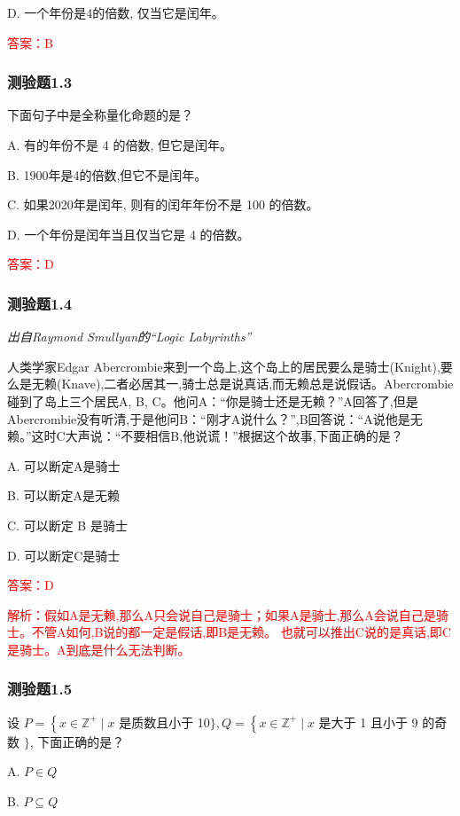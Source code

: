 \documentclass[UTF8, heading=true]{ctexart}
\begin{document}
D. 一个年份是4的倍数, 仅当它是闰年。

\textcolor{red}{答案：B}

\subsubsection{测验题1.3}

下面句子中是全称量化命题的是？

A. 有的年份不是 4 的倍数, 但它是闰年。

B. 1900年是4的倍数,但它不是闰年。

C. 如果2020年是闰年, 则有的闰年年份不是 100 的倍数。

D. 一个年份是闰年当且仅当它是 4 的倍数。

\textcolor{red}{答案：D}

\subsubsection{测验题1.4}

\textit{出自Raymond Smullyan的``Logic Labyrinths''}

人类学家Edgar Abercrombie来到一个岛上,这个岛上的居民要么是骑士(Knight),要么是无赖(Knave),二者必居其一,骑士总是说真话,而无赖总是说假话。Abercrombie碰到了岛上三个居民A, B, C。他问A：“你是骑士还是无赖？”A回答了,但是Abercrombie没有听清,于是他问B：“刚才A说什么？”,B回答说：“A说他是无赖。”这时C大声说：“不要相信B,他说谎！”根据这个故事,下面正确的是？

A. 可以断定A是骑士

B. 可以断定A是无赖

C. 可以断定 B 是骑士

D. 可以断定C是骑士

\textcolor{red}{答案：D}

\textcolor{red}{解析：假如A是无赖,那么A只会说自己是骑士；如果A是骑士,那么A会说自己是骑士。不管A如何,B说的都一定是假话,即B是无赖。
也就可以推出C说的是真话,即C是骑士。A到底是什么无法判断。}

\subsubsection{测验题1.5}

设 $P=\left\{x \in \mathbb{Z}^{+} \mid x\right.$ 是质数且小于 10$\}, Q=\left\{x \in \mathbb{Z}^{+} \mid x\right.$ 是大于 1 且小于 9 的奇数 $\}$,
下面正确的是？

A. $P \in Q$

B. $P \subseteq Q$
\end{document}
